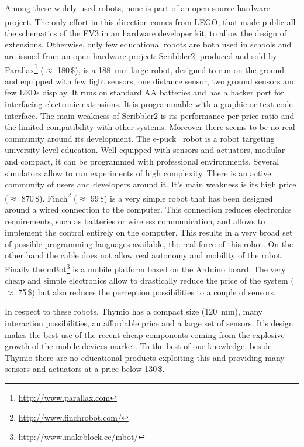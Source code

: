 \documentclass[letterpaper, 10 pt, conference]{ieeeconf}  %
\begin{document}
Among these widely used robots, none is part of an open source hardware project.
The only effort in this direction comes from LEGO\textsuperscript{\textregistered}, that made public all the schematics of the EV3 in an hardware developer kit, to allow the design of extensions. 
Otherwise, only few educational robots are both used in schools and are issued from an open hardware project:
Scribbler2, produced and sold by Parallax\footnote{\url{http://www.parallax.com}} ($\approx$ 180\,\$), is a 188~mm large robot, designed to run on the ground and equipped with few light sensors, one distance sensor, two ground sensors and few LEDs display.
It runs on standard AA batteries and has a hacker port for interfacing electronic extensions.
It is programmable with a graphic or text code interface.  
The main weakness of Scribbler2 is its performance per price ratio and the limited compatibility with other systems. 
Moreover there seems to be no real community around its development.
The e-puck~\cite{mondada2009puck} robot is a robot targeting university-level education.
Well equipped with sensors and actuators, modular and compact, it can be programmed with professional environments.
Several simulators allow to run experiments of high complexity. 
There is an active community of users and developers around it.
It's main weakness is its high price ($\approx$ 870\,\$).
Finch\footnote{\url{http://www.finchrobot.com/}} ($\approx$ 99\,\$) is a very simple robot that has been designed around a wired connection to the computer. 
This connection reduces electronics requirements, such as batteries or wireless communication, and allows to implement the control entirely on the computer.
This results in a very broad set of possible programming languages available, the real force of this robot. 
On the other hand the cable does not allow real autonomy and mobility of the robot.
Finally the mBot\footnote{\url{http://www.makeblock.cc/mbot/}} is a mobile platform based on the Arduino board. 
The very cheap and simple electronics allow to drastically reduce the price of the system ($\approx$ 75\,\$) but also reduces the perception possibilities to a couple of sensors. 

In respect to these robots, Thymio has a compact size (120~mm), many interaction possibilities, an affordable price and a large set of sensors.
It's design makes the best use of the recent cheap components coming from the explosive growth of the mobile devices market. 
To the best of our knowledge, beside Thymio there are no educational products exploiting this and providing many sensors and actuators at a price below 130\,\$.
\end{document}
